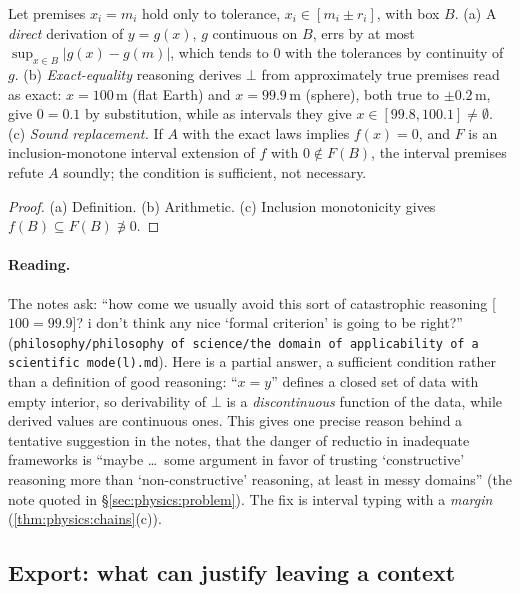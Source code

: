 \begin{proposition}\label{prop:physics:continuity}
Let premises $x_i=m_i$ hold only to tolerance, $x_i\in[m_i\pm r_i]$, with box $B$.
\textup{(a)} A \emph{direct} derivation of $y=g(x)$, $g$ continuous on $B$, errs by at most
$\sup_{x\in B}|g(x)-g(m)|$, which tends to $0$ with the tolerances by continuity of $g$.
\textup{(b)} \emph{Exact-equality} reasoning derives $\bot$ from approximately true
premises read as exact: $x=100$\,m (flat Earth) and $x=99.9$\,m (sphere), both true to
$\pm0.2$\,m, give $0=0.1$ by substitution, while as intervals they give
$x\in[99.8,100.1]\neq\emptyset$. \textup{(c)} \emph{Sound replacement.} If $A$ with the
exact laws implies $f(x)=0$, and $F$ is an inclusion-monotone interval extension of $f$
with $0\notin F(B)$, the interval premises refute $A$ soundly; the condition is
sufficient, not necessary.
\end{proposition}
\begin{proof}
(a) Definition. (b) Arithmetic. (c) Inclusion monotonicity \citep{moore1966interval} gives
$f(B)\subseteq F(B)\not\ni0$.
\end{proof}

\paragraph{Reading.} The notes ask: ``how come we usually avoid this sort of catastrophic
reasoning [$100=99.9$]? i don't think any nice `formal criterion' is going to be right?''
(\texttt{philosophy/philosophy of science/the domain of applicability of a scientific
mode(l).md}). Here is a partial answer, a sufficient condition rather than a definition of
good reasoning: ``$x=y$'' defines a closed set of data with empty interior, so
derivability of $\bot$ is a \emph{discontinuous} function of the data, while derived values
are continuous ones. This gives one precise reason behind a tentative suggestion in the
notes, that the danger of reductio in inadequate frameworks is ``maybe \dots\ some argument
in favor of trusting `constructive' reasoning more than `non-constructive' reasoning, at
least in messy domains'' (the note quoted in \S\ref{sec:physics:problem}). The fix is
interval typing with a \emph{margin} (\cref{thm:physics:chains}(c)).

\subsection{Export: what can justify leaving a context}\label{sec:physics:export}

